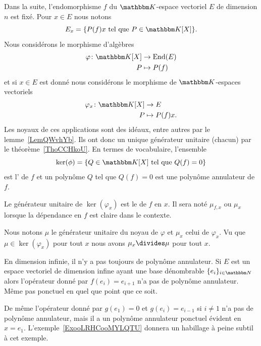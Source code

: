 Dans la suite, l'endomorphisme \( f\) du \( \eK\)-espace vectoriel \( E\) de dimension \( n\) est fixé. Pour \( x\in E\) nous notons
\begin{equation}            \label{EqooOAYDooEpZELo}
    E_x=\{ P(f)x\tq P\in \eK[X] \}.
\end{equation}
Nous considérons le morphisme d'algèbres
\begin{equation}
    \begin{aligned}
        \varphi\colon \eK[X]&\to \End(E) \\
        P&\mapsto P(f)
    \end{aligned}
\end{equation}
et si \( x\in E\) est donné nous considérons le morphisme de \( \eK\)-espaces vectoriels
\begin{equation}
    \begin{aligned}
        \varphi_x\colon \eK[X]&\to E \\
        P&\mapsto P(f)x.
    \end{aligned}
\end{equation}
Les noyaux de ces applications sont des idéaux, entre autres par le lemme~\ref{LemQWvhYb}. Ils ont donc un unique générateur unitaire (chacun) par le théorème~\ref{ThoCCHkoU}. En termes de vocabulaire, l'ensemble
\begin{equation}
    \ker(\phi)=\{  Q\in\eK[X]\tq Q(f)=0  \}
\end{equation}
est l' de \( f\) et un polynôme \( Q\) tel que \( Q(f)=0\) est une polynôme annulateur de \( f\).

\begin{definition}      \label{DEFooUICRooBGYhqQ}
    Le générateur unitaire de \( \ker(\varphi_x)\) est le  de \( f\) en \( x\). Il sera noté \( \mu_{f,x}\) ou \( \mu_x\) lorsque la dépendance en \( f\) est claire dans le contexte.
\end{definition}
Nous notons \( \mu\) le générateur unitaire du noyau de \( \varphi\) et \( \mu_x\) celui de \( \varphi_x\). Vu que \( \mu\in\ker(\varphi_x)\) pour tout \( x\) nous avons \( \mu_x\divides \mu\) pour tout \( x\).

\begin{example}       \label{ExooDTUJooIMqSKn}
    En dimension infinie, il n'y a pas toujours de polynôme annulateur. Si \( E\) est un espace vectoriel de dimension infine ayant une base dénombrable \( \{ e_i \}_{i\in \eN}\) alors l'opérateur donné par \( f(e_i)=e_{i+1}\) n'a pas de polynôme annulateur. Même pas ponctuel en quel que point que ce soit.

    De même l'opérateur donné par \( g(e_1)=0\) et \( g(e_i)=e_{i-1}\) si \( i\neq 1\) n'a pas de polynôme annulateur, mais il a un polynôme annulateur ponctuel évident en \( x=e_1\). L'exemple~\ref{ExooLRHCooMYLQTU} donnera un habillage à peine subtil à cet exemple.
\end{example}

